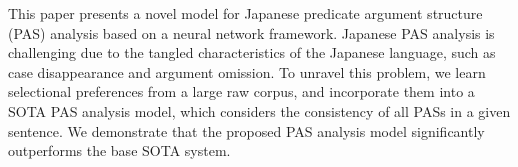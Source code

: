 This paper presents a novel model for Japanese predicate argument structure (PAS) analysis based on a neural network framework. Japanese PAS analysis is challenging due to the tangled characteristics of the Japanese language, such as case disappearance and argument omission. To unravel this problem, we learn selectional preferences from a large raw corpus, and incorporate them into a SOTA PAS analysis model, which considers the consistency of all PASs in a given sentence. We demonstrate that the proposed PAS analysis model significantly outperforms the base SOTA system.
